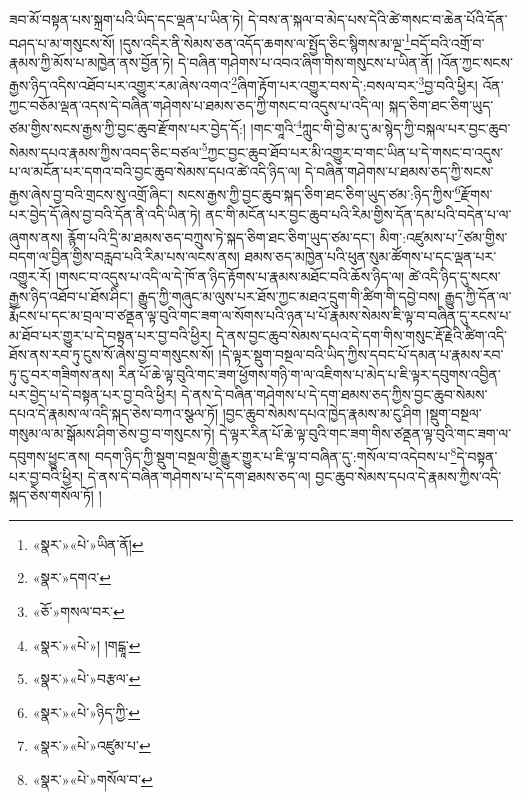 ཟབ་མོ་བསྟན་པས་སྐྲག་པའི་ཡིད་དང་ལྡན་པ་ཡིན་ཏེ། དེ་བས་ན་སྐལ་བ་མེད་པས་དེའི་ཚེ་གསང་བ་ཆེན་པོའི་དོན་བཤད་པ་མ་གསུངས་སོ། །དུས་འདིར་ནི་སེམས་ཅན་འདོད་ཆགས་ལ་སྤྱོད་ཅིང་སྙིགས་མ་ལྔ་\footnote{«སྣར་»«པེ་»ཡིན་ནོ། }བདོ་བའི་འགྲོ་བ་རྣམས་ཀྱི་མོས་པ་མཁྱེན་ནས་བྱོན་ཏེ། དེ་བཞིན་གཤེགས་པ་འབའ་ཞིག་གིས་གསུངས་པ་ཡིན་ནོ། །འོན་ཀྱང་སངས་རྒྱས་ཉིད་འདིས་འཐོབ་པར་འགྱུར་རམ་ཞེས་འགའ་\footnote{«སྣར་»དགའ་}ཞིག་རྟོག་པར་འགྱུར་བས་དེ་:བསལ་བར་\footnote{«ཅོ་»གསལ་བར་}བྱ་བའི་ཕྱིར། འོན་ཀྱང་བཅོམ་ལྡན་འདས་དེ་བཞིན་གཤེགས་པ་ཐམས་ཅད་ཀྱི་གསང་བ་འདུས་པ་འདི་ལ། སྐད་ཅིག་ཐང་ཅིག་ཡུད་ཙམ་གྱིས་སངས་རྒྱས་ཀྱི་བྱང་ཆུབ་རྫོགས་པར་བྱེད་དོ:། །གང་གཱའི་\footnote{«སྣར་»«པེ་»། །གངྒཱ་}ཀླུང་གི་བྱེ་མ་དུ་མ་སྙེད་ཀྱི་བསྐལ་པར་བྱང་ཆུབ་སེམས་དཔའ་རྣམས་ཀྱིས་འབད་ཅིང་བཙལ་\footnote{«སྣར་»«པེ་»བརྩལ་}ཀྱང་བྱང་ཆུབ་ཐོབ་པར་མི་འགྱུར་བ་གང་ཡིན་པ་དེ་གསང་བ་འདུས་པ་ལ་མངོན་པར་དགའ་བའི་བྱང་ཆུབ་སེམས་དཔའ་ཚེ་འདི་ཉིད་ལ། དེ་བཞིན་གཤེགས་པ་ཐམས་ཅད་ཀྱི་སངས་རྒྱས་ཞེས་བྱ་བའི་གྲངས་སུ་འགྲོ་ཞིང་། སངས་རྒྱས་ཀྱི་བྱང་ཆུབ་སྐད་ཅིག་ཐང་ཅིག་ཡུད་ཙམ་:ཉིད་ཀྱིས་\footnote{«སྣར་»«པེ་»ཉིད་ཀྱི་}རྫོགས་པར་བྱེད་དོ་ཞེས་བྱ་བའི་དོན་ནི་འདི་ཡིན་ཏེ། ནང་གི་མངོན་པར་བྱང་ཆུབ་པའི་རིམ་གྱིས་དོན་དམ་པའི་བདེན་པ་ལ་ཞུགས་ནས། རྙོག་པའི་དྲི་མ་ཐམས་ཅད་བཀྲུས་ཏེ་སྐད་ཅིག་ཐང་ཅིག་ཡུད་ཙམ་དང་། མིག་:འཛུམས་པ་\footnote{«སྣར་»«པེ་»འཛུམ་པ་}ཙམ་གྱིས་བདག་ལ་བྱིན་གྱིས་བརླབ་པའི་རིམ་པས་ལངས་ནས། ཐམས་ཅད་མཁྱེན་པའི་ཕུན་སུམ་ཚོགས་པ་དང་ལྡན་པར་འགྱུར་རོ། །གསང་བ་འདུས་པ་འདི་ལ་དེ་ཁོ་ན་ཉིད་རྟོགས་པ་རྣམས་མཐོང་བའི་ཆོས་ཉིད་ལ། ཚེ་འདི་ཉིད་དུ་སངས་རྒྱས་ཉིད་འཐོབ་པ་ཐོས་ཤིང་། རྒྱུད་ཀྱི་གཞུང་མ་ལུས་པར་ཐོས་ཀྱང་མཐའ་དྲུག་གི་ཚིག་གི་དབྱེ་བས། རྒྱུད་ཀྱི་དོན་ལ་རྨོངས་པ་དང་མ་བྲལ་བ་ཙནྡན་ལྟ་བུའི་གང་ཟག་ལ་སོགས་པའི་ཉན་པ་པོ་རྣམས་སེམས་ཇི་ལྟ་བ་བཞིན་དུ་རངས་པ་མ་ཐོབ་པར་གྱུར་པ་དེ་བསྟན་པར་བྱ་བའི་ཕྱིར། དེ་ནས་བྱང་ཆུབ་སེམས་དཔའ་དེ་དག་གིས་གསུང་རྡོ་རྗེའི་ཚིག་འདི་ཐོས་ནས་རབ་ཏུ་ངུས་སོ་ཞེས་བྱ་བ་གསུངས་སོ། །དེ་ལྟར་སྡུག་བསྔལ་བའི་ཡིད་ཀྱིས་དབང་པོ་དམན་པ་རྣམས་རབ་ཏུ་ངུ་བར་གཟིགས་ནས། རིན་པོ་ཆེ་ལྟ་བུའི་གང་ཟག་ཕྱོགས་གཉི་ག་ལ་འཇིགས་པ་མེད་པ་ཇི་ལྟར་དབུགས་འབྱིན་པར་བྱེད་པ་དེ་བསྟན་པར་བྱ་བའི་ཕྱིར། དེ་ནས་དེ་བཞིན་གཤེགས་པ་དེ་དག་ཐམས་ཅད་ཀྱིས་བྱང་ཆུབ་སེམས་དཔའ་དེ་རྣམས་ལ་འདི་སྐད་ཅེས་བཀའ་སྩལ་ཏོ། །བྱང་ཆུབ་སེམས་དཔའ་ཁྱེད་རྣམས་མ་ངུ་ཤིག །སྡུག་བསྔལ་གསུམ་ལ་མ་སྒོམས་ཤིག་ཅེས་བྱ་བ་གསུངས་ཏེ། དེ་ལྟར་རིན་པོ་ཆེ་ལྟ་བུའི་གང་ཟག་གིས་ཙནྡན་ལྟ་བུའི་གང་ཟག་ལ་དབུགས་ཕྱུང་ནས། བདག་ཉིད་ཀྱི་སྡུག་བསྔལ་གྱི་རྒྱུར་གྱུར་པ་ཇི་ལྟ་བ་བཞིན་དུ་:གསོལ་བ་འདེབས་པ་\footnote{«སྣར་»«པེ་»གསོལ་བ་}དེ་བསྟན་པར་བྱ་བའི་ཕྱིར། དེ་ནས་དེ་བཞིན་གཤེགས་པ་དེ་དག་ཐམས་ཅད་ལ། བྱང་ཆུབ་སེམས་དཔའ་དེ་རྣམས་ཀྱིས་འདི་སྐད་ཅེས་གསོལ་ཏོ། །

